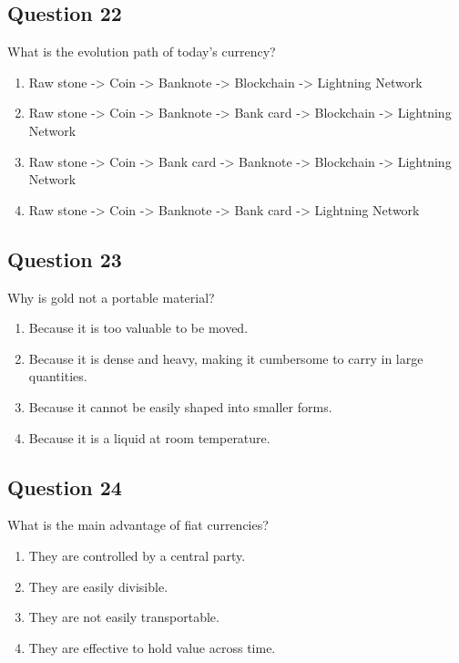 \documentclass[12pt,a4paper]{article}
\begin{document}
\bigskip


\subsection*{Question 22}
What is the evolution path of today's currency?

\begin{enumerate}[label=\Alph*., leftmargin=*]
\item Raw stone -> Coin -> Banknote -> Blockchain -> Lightning Network
\item Raw stone -> Coin -> Banknote -> Bank card -> Blockchain -> Lightning Network
\item Raw stone -> Coin -> Bank card -> Banknote -> Blockchain -> Lightning Network
\item Raw stone -> Coin -> Banknote -> Bank card -> Lightning Network
\end{enumerate}

\bigskip


\subsection*{Question 23}
Why is gold not a portable material?

\begin{enumerate}[label=\Alph*., leftmargin=*]
\item Because it is too valuable to be moved.
\item Because it is dense and heavy, making it cumbersome to carry in large quantities.
\item Because it cannot be easily shaped into smaller forms.
\item Because it is a liquid at room temperature.
\end{enumerate}

\bigskip


\subsection*{Question 24}
What is the main advantage of fiat currencies?

\begin{enumerate}[label=\Alph*., leftmargin=*]
\item They are controlled by a central party.
\item They are easily divisible.
\item They are not easily transportable.
\item They are effective to hold value across time.
\end{enumerate}
\end{document}
